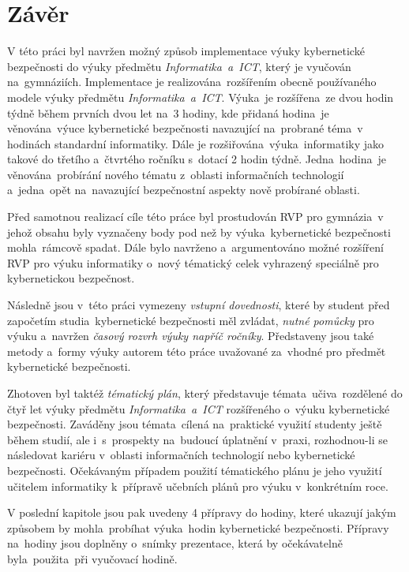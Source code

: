 \documentclass[a4paper, 12pt]{article}
\begin{document}
\section{Závěr}
V této práci byl navržen možný způsob implementace výuky kybernetické bezpečnosti do výuky předmětu \textit{Informatika~a~ICT}, který je vyučován na~gymnáziích. Implementace je realizována~rozšířením obecně používaného modele výuky předmětu \textit{Informatika~a~ICT}. Výuka~je rozšířena~ze dvou hodin týdně během prvních dvou let na~3 hodiny, kde přidaná hodina~je věnována~výuce kybernetické bezpečnosti navazující na~probrané téma~v hodinách standardní informatiky. Dále je rozšiřována~výuka~informatiky jako takové do třetího a~čtvrtého ročníku s~dotací 2 hodin týdně. Jedna~hodina~je věnována~probírání nového tématu z~oblasti informačních technologií a~jedna~opět na~navazující bezpečnostní aspekty nově probírané oblasti.

Před samotnou realizací cíle této práce byl prostudován RVP pro gymnázia~v jehož obsahu byly vyznačeny body pod než by výuka~kybernetické bezpečnosti mohla~rámcově spadat. Dále bylo navrženo a~argumentováno možné rozšíření RVP pro výuku informatiky o~nový tématický celek vyhrazený speciálně pro kybernetickou bezpečnost.

Následně jsou v~této práci vymezeny \textit{vstupní dovednosti}, které by student před započetím studia~kybernetické bezpečnosti měl zvládat, \textit{nutné pomůcky} pro výuku a~navržen \textit{časový rozvrh výuky napříč ročníky}. Představeny jsou také metody a~formy výuky autorem této práce uvažované za~vhodné pro předmět kybernetické bezpečnosti.

Zhotoven byl taktéž \textit{tématický plán}, který představuje témata~učiva~rozdělené do čtyř let výuky předmětu \textit{Informatika~a~ICT} rozšířeného o~výuku kybernetické bezpečnosti. Zaváděny jsou témata~cílená na~praktické využití studenty ještě během studií, ale i~s~prospekty na~budoucí úplatnění v~praxi, rozhodnou-li se následovat kariéru v~oblasti informačních technologií nebo kybernetické bezpečnosti. Očekávaným případem použití tématického plánu je jeho využití učitelem informatiky k~přípravě učebních plánů pro výuku v~konkrétním roce.

V poslední kapitole jsou pak uvedeny 4 přípravy do hodiny, které ukazují jakým způsobem by mohla~probíhat výuka~hodin kybernetické bezpečnosti. Přípravy na~hodiny jsou doplněny o~snímky prezentace, která by očekávatelně byla~použita~při vyučovací hodině.
\end{document}
